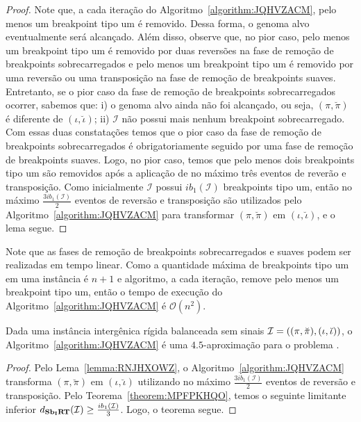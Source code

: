 \begin{proof}
Note que, a cada iteração do Algoritmo~\ref{algorithm:JQHVZACM}, pelo menos um breakpoint tipo um é removido. Dessa forma, o genoma alvo eventualmente será alcançado. Além disso, observe que, no pior caso, pelo menos um breakpoint tipo um é removido por duas reversões na fase de remoção de breakpoints sobrecarregados e pelo menos um breakpoint tipo um é removido por uma reversão ou uma transposição na fase de remoção de breakpoints suaves. Entretanto, se o pior caso da fase de remoção de breakpoints sobrecarregados ocorrer, sabemos que: i) o genoma alvo ainda não foi alcançado, ou seja, $(\pi,\breve\pi)$ é diferente de $(\iota,\breve\iota)$; ii) $\mathcal{I}$ não possui mais nenhum breakpoint sobrecarregado. Com essas duas constatações temos que o pior caso da fase de remoção de breakpoints sobrecarregados é obrigatoriamente seguido por uma fase de remoção de breakpoints suaves. Logo, no pior caso, temos que pelo menos dois breakpoints tipo um são removidos após a aplicação de no máximo três eventos de reverão e transposição. Como inicialmente $\mathcal{I}$ possui $ib_1(\mathcal{I})$ breakpoints tipo um, então no máximo $\frac{3ib_1(\mathcal{I})}{2}$ eventos de reversão e transposição são utilizados pelo Algoritmo~\ref{algorithm:JQHVZACM} para transformar $(\pi,\breve\pi)$ em $(\iota,\breve\iota)$, e o lema segue.
\end{proof}

Note que as fases de remoção de breakpoints sobrecarregados e suaves podem ser realizadas em tempo linear. Como a quantidade máxima de breakpoints tipo um em uma instância é $n+1$ e algoritmo, a cada iteração, remove pelo menos um breakpoint tipo um, então o tempo de execução do Algoritmo~\ref{algorithm:JQHVZACM} é $\mathcal{O}(n^2)$.


\begin{theorem}\label{theorem:QKJNIMOI}
Dada uma instância intergênica rígida balanceada sem sinais $\mathcal{I}=\break((\pi,\breve\pi),(\iota,\breve\iota))$, o Algoritmo~\ref{algorithm:JQHVZACM} é uma $4.5$-aproximação para o problema \SbIRT{}.
\end{theorem}
\begin{proof}
Pelo Lema~\ref{lemma:RNJHXOWZ}, o Algoritmo~\ref{algorithm:JQHVZACM} transforma $(\pi,\breve\pi)$ em $(\iota,\breve\iota)$ utilizando no máximo $\frac{3ib_1(\mathcal{I})}{2}$ eventos de reversão e transposição. Pelo Teorema~\ref{theorem:MPFPKHQO}, temos o seguinte limitante inferior $d_{\textbf{Sb\textsubscript{I}RT}}(\mathcal{I}) \ge \frac{ib_1(\mathcal{I})}{3}$. Logo, o teorema segue. 
\end{proof}